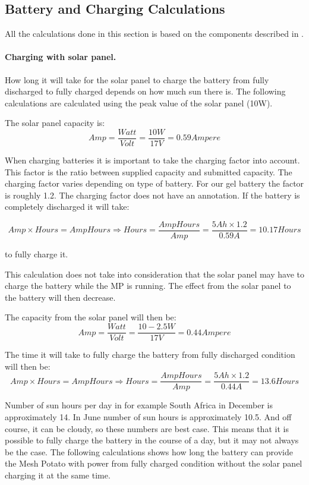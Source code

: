 \subsection{Battery and Charging Calculations}
All the calculations done in this section is based on the components described in . 

\paragraph{Charging with solar panel.}
How long it will take for the solar panel to charge the battery from fully discharged to fully charged depends on how much sun there is. The following calculations are calculated using the peak value of the solar panel (10W). 

The solar panel capacity is:
$$Amp = \frac{Watt}{Volt} = \frac{10 W}{17 V} = 0.59 Ampere$$

When charging batteries it is important to take the charging factor into account. This factor is the ratio between supplied capacity and submitted capacity. The charging factor varies depending on type of battery. For our gel battery the factor is roughly 1.2. The charging factor does not have an annotation. 
If the battery is completely discharged it will take: 

$$Amp\times Hours = AmpHours \Rightarrow Hours =\frac{AmpHours}{Amp} = \frac{5 Ah\times 1.2}{0.59 A} = 10.17 Hours$$

to fully charge it. 

This calculation does not take into consideration that the solar panel may have to charge the battery while the MP is running. The effect from the solar panel to the battery will then decrease. 

The capacity from the solar panel will then be: 
$$Amp = \frac{Watt}{Volt} = \frac{10-2.5 W}{17 V} = 0.44 Ampere$$

The time it will take to fully charge the battery from fully discharged condition will then be: 
$$Amp\times Hours = AmpHours \Rightarrow Hours =\frac{AmpHours}{Amp} = \frac{5 Ah\times 1.2}{0.44A} = 13.6 Hours$$

Number of sun hours per day in for example South Africa in December is approximately 14. In June number of sun hours is approximately 10.5. And off course, it can be cloudy, so these numbers are best case. This means that it is possible to fully charge the battery in the course of a day, but it may not always be the case. The following calculations shows how long the battery can provide the Mesh Potato with power from fully charged condition without the solar panel charging it at the same time. 

